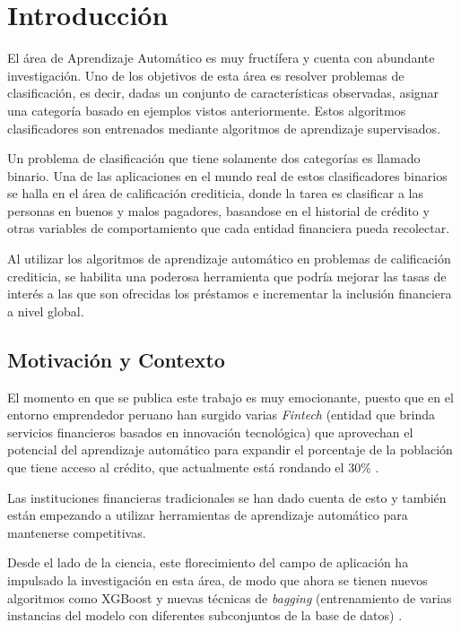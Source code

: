 \chapter{Introducción}

El área de Aprendizaje Automático es muy fructífera y cuenta con abundante investigación. Uno de los objetivos de esta área es resolver problemas de clasificación, es decir, dadas un conjunto de características observadas, asignar una categoría basado en ejemplos vistos anteriormente. Estos algoritmos clasificadores son entrenados mediante algoritmos de aprendizaje supervisados.

Un problema de clasificación que tiene solamente dos categorías es llamado binario. Una de las aplicaciones en el mundo real de estos clasificadores binarios se halla en el área de calificación crediticia, donde la tarea es clasificar a las personas en buenos y malos pagadores, basandose en el historial de crédito y otras variables de comportamiento que cada entidad financiera pueda recolectar.

Al utilizar los algoritmos de aprendizaje automático en problemas de calificación crediticia, se habilita una poderosa herramienta que podría mejorar las tasas de interés a las que son ofrecidas los préstamos e incrementar la inclusión financiera a nivel global.

\section{Motivación y Contexto}

El momento en que se publica este trabajo es muy emocionante, puesto que en el entorno emprendedor peruano han surgido varias \textit{Fintech} (entidad que brinda servicios financieros basados en innovación tecnológica) que aprovechan el potencial del aprendizaje automático para expandir el porcentaje de la población que tiene acceso al crédito, que actualmente está rondando el 30\% \citep{carballo2019fintech}.

Las instituciones financieras tradicionales se han dado cuenta de esto y también están empezando a utilizar herramientas de aprendizaje automático para mantenerse competitivas.

Desde el lado de la ciencia, este florecimiento del campo de aplicación ha impulsado la investigación en esta área, de modo que ahora se tienen nuevos algoritmos como \ac{XGBoost} \citep{Chen:2016:XST:2939672.2939785} y nuevas técnicas de \textit{bagging} (entrenamiento de varias instancias del modelo con diferentes subconjuntos de la base de datos) \citep{breiman1996bagging}.


